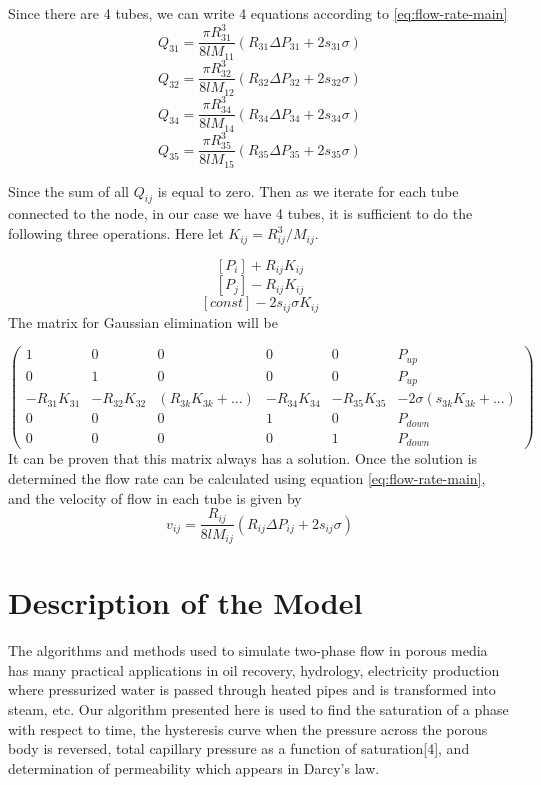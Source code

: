\documentclass[12pt, a4paper]{article}
\begin{document}
Since there are 4 tubes, we can write 4 equations according to \ref{eq:flow-rate-main}
\[ Q_{31} = \frac{\pi R_{31}^3}{8lM_{11}}(R_{31}\Delta P_{31} + 2s_{31}\sigma) \]
\[ Q_{32} = \frac{\pi R_{32}^3}{8lM_{12}}(R_{32}\Delta P_{32} + 2s_{32}\sigma) \]
\[ Q_{34} = \frac{\pi R_{34}^3}{8lM_{14}}(R_{34}\Delta P_{34} + 2s_{34}\sigma) \]
\[ Q_{35} = \frac{\pi R_{35}^3}{8lM_{15}}(R_{35}\Delta P_{35} + 2s_{35}\sigma) \]

Since the sum of all $Q_{ij}$ is equal to zero. Then as we iterate for each tube connected to the node, in our case we have 4 tubes, it is sufficient to do the following three operations. Here let $K_{ij} = R^3_{ij}/{M}_{ij}$.

\[ [P_i] + R_{ij}K_{ij} \]
\[ [P_j] - R_{ij}K_{ij} \]
\[ [const] - 2s_{ij}\sigma K_{ij} \]
The matrix for Gaussian elimination will be

\[ 
\begin{pmatrix}
	1 & 0 & 0 & 0 & 0 & P_{up}\\
	0 & 1 & 0 & 0 & 0 & P_{up}\\
	-R_{31}K_{31} & -R_{32}K_{32} & (R_{3k}K_{3k} + ...) & -R_{34}K_{34} & -R_{35}K_{35} & -2\sigma(s_{3k}K_{3k} + ...)\\
	0 & 0 & 0 & 1 & 0 & P_{down}\\
	0 & 0 & 0 & 0 & 1 & P_{down}
\end{pmatrix}
\]
 It can be proven that this matrix always has a solution. Once the solution is determined the flow rate can be calculated using equation \ref{eq:flow-rate-main}, and the velocity of flow in each tube is given by
\begin{equation} \label{eq:velocity-in-tube}
\boxed{v_{ij} = \frac{R_{ij}}{8lM_{ij}}(R_{ij}\Delta P_{ij} + 2s_{ij}\sigma)}
\end{equation}

\section{Description of the Model}
The algorithms and methods used to simulate two-phase flow in porous media has many practical applications in oil recovery, hydrology, electricity production where pressurized water is passed through heated pipes and is transformed into steam, etc. Our algorithm presented here is used to find the saturation of a phase with respect to time, the hysteresis curve when the pressure across the porous body is reversed, total capillary pressure as a function of saturation[4], and determination of permeability which appears in Darcy’s law.
\end{document}
